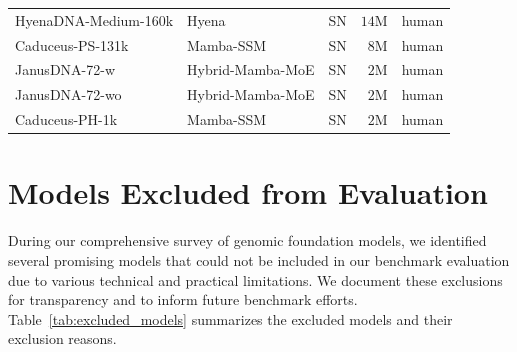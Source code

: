 \documentclass{article}
\theoremstyle{plain}
\theoremstyle{definition}
\theoremstyle{remark}
\begin{document}
\begin{table}[h]
\begin{tabular}{@{}lllrl@{}}
HyenaDNA-Medium-160k      & Hyena               & SN         & $14$M  & human \\
Caduceus-PS-131k          & Mamba-SSM           & SN         & $8$M   & human \\
JanusDNA-72-w             & Hybrid-Mamba-MoE    & SN         & $2$M   & human \\
JanusDNA-72-wo            & Hybrid-Mamba-MoE    & SN         & $2$M   & human \\
Caduceus-PH-1k            & Mamba-SSM           & SN         & $2$M   & human \\
\bottomrule
\end{tabular}
\end{table}

\clearpage

\section{Models Excluded from Evaluation}
\label{app:excluded_models}

During our comprehensive survey of genomic foundation models, we identified several promising models that could not be included in our benchmark evaluation due to various technical and practical limitations. We document these exclusions for transparency and to inform future benchmark efforts. Table~\ref{tab:excluded_models} summarizes the excluded models and their exclusion reasons.
\end{document}
